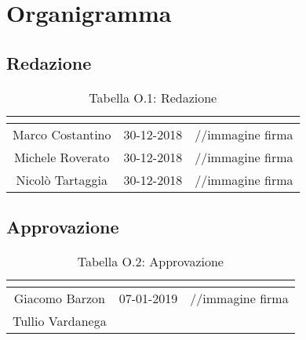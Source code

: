 \renewcommand\thesection{\Alph{section}}
\setcounter{section}{14} 
\section{Organigramma}

\subsection{Redazione}
\renewcommand{\arraystretch}{2}
\begin{table}[H]
\begin{center}
  \begin{tabular}{| c | c | c |}
    \hline
    \rowcolor{title_row}
    \textbf{\color{title_text}{Nominativo}} & \textbf{\color{title_text}{Data}} & \textbf{\color{title_text}{Firma}} \\ \hline
    Marco Costantino & 30-12-2018 & //immagine firma \\ \hline
    Michele Roverato & 30-12-2018 & //immagine firma \\ \hline
    Nicolò Tartaggia & 30-12-2018 & //immagine firma \\ 
    \hline
  \end{tabular}
  \caption{Tabella O.1: Redazione\label{}}
\end{center}
\end{table}
\renewcommand{\arraystretch}{1}

\subsection{Approvazione}
\renewcommand{\arraystretch}{2}
\begin{table}[H]
\begin{center}
  \begin{tabular}{| c | c | c |}
    \hline
    \rowcolor{title_row}
    \textbf{\color{title_text}{Nominativo}} & \textbf{\color{title_text}{Data}} & \textbf{\color{title_text}{Firma}} \\ \hline
    Giacomo Barzon & 07-01-2019 & //immagine firma \\ \hline
    Tullio Vardanega &  &  \\
    \hline
  \end{tabular}
  \caption{Tabella O.2: Approvazione\label{}}
\end{center}
\end{table}
\renewcommand{\arraystretch}{1}

